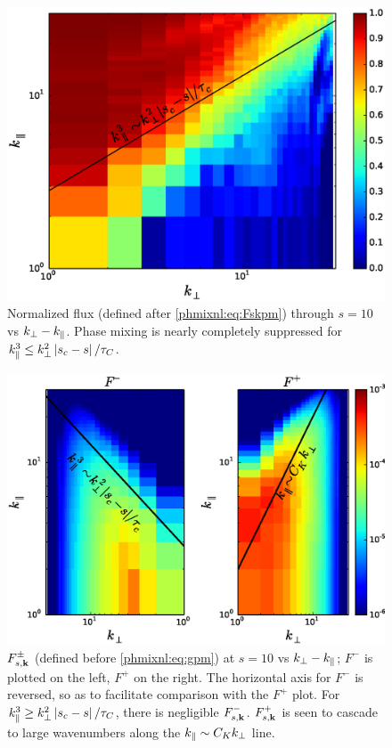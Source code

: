     \begin{figure}
    \begin{center}
        \includegraphics[width=14.8cm]{figs/phmixnl/M900_m100_pmsupp_vskpkz.eps}
        \caption{Normalized flux (defined after \eqref{phmixnl:eq:Fskpm}) through $s=10$ vs
        $k_\perp-k_\parallel$. Phase mixing is nearly completely suppressed for $k_\parallel^3 \leq
        k_\perp^2 \left|s_c -s\right|/\tau_C$.}
        \label{phmixnl:fig:m100supp:vskpkz}
    \end{center}
    \end{figure}
    \begin{figure}
    \begin{center}
        \includegraphics[width=14.8cm]{figs/phmixnl/M900_m100_fpm_vskpkz.eps}
        \caption{$F_{s,\mathbf{k}}^\pm$ (defined before \eqref{phmixnl:eq:gpm}) at $s=10$ vs
        $k_\perp-k_\parallel$; $F^-$ is plotted on the left, $F^+$ on the right. The horizontal
        axis for $F^-$ is reversed, so as to facilitate comparison with the $F^+$
        plot. For $k_\parallel^3 \geq k_\perp^2 \left|s_c-s\right|/\tau_C$,
        there is negligible $F_{s,\mathbf{k}}^-$. $F_{s,\mathbf{k}}^+$ is seen to cascade to large wavenumbers
        along the $k_\parallel\sim C_K k_\perp$ line.}
        \label{phmixnl:fig:m100fpm:vskpkz}
    \end{center}
    \end{figure}

